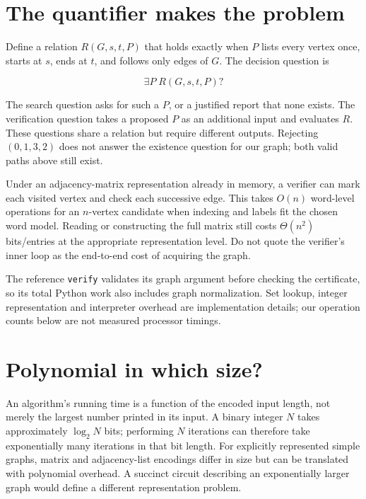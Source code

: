 \section{The quantifier makes the
problem}\label{the-quantifier-makes-the-problem}

Define a relation \(R(G,s,t,P)\) that holds exactly when \(P\) lists
every vertex once, starts at \(s\), ends at \(t\), and follows only
edges of \(G\). The decision question is

\begin{equation}
\exists P\;R(G,s,t,P)?
\end{equation}

The search question asks for such a \(P\), or a justified report that
none exists. The verification question takes a proposed \(P\) as an
additional input and evaluates \(R\). These questions share a relation
but require different outputs. Rejecting \((0,1,3,2)\) does not answer
the existence question for our graph; both valid paths above still
exist.


Under an adjacency-matrix representation already in memory, a verifier
can mark each visited vertex and check each successive edge. This takes
\(O(n)\) word-level operations for an \(n\)-vertex candidate when
indexing and labels fit the chosen word model. Reading or constructing
the full matrix still costs \(\Theta(n^2)\) bits/entries at the
appropriate representation level. Do not quote the verifier's inner loop
as the end-to-end cost of acquiring the graph.

The reference \texttt{verify} validates its graph argument before
checking the certificate, so its total Python work also includes graph
normalization. Set lookup, integer representation and interpreter
overhead are implementation details; our operation counts below are not
measured processor timings.

\section{Polynomial in which size?}\label{polynomial-in-which-size}

An algorithm's running time is a function of the encoded input length,
not merely the largest number printed in its input. A binary integer
\(N\) takes approximately \(\log_2 N\) bits; performing \(N\) iterations
can therefore take exponentially many iterations in that bit length. For
explicitly represented simple graphs, matrix and adjacency-list
encodings differ in size but can be translated with polynomial overhead.
A succinct circuit describing an exponentially larger graph would define
a different representation problem.

